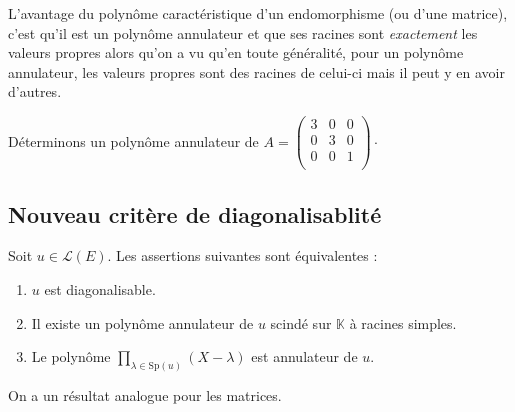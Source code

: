 \documentclass[french,11pt,twoside]{VcCours}
\begin{document}
 \begin{Remarque}{} L'avantage du polynôme caractéristique d'un endomorphisme (ou d'une matrice), c'est qu'il est un polynôme annulateur et que ses racines sont \emph{exactement} les valeurs propres alors qu'on a vu qu'en toute généralité, pour un polynôme annulateur, les valeurs propres sont des racines de celui-ci mais il peut y en avoir d'autres.
 \end{Remarque}
 
 \begin{Exemple}{} Déterminons un polynôme annulateur de $A = \begin{pmatrix}
 3 & 0 & 0 \\
 0 & 3 & 0\\
 0 & 0 & 1 \\
 \end{pmatrix}\cdot$
 
 \vspace{7cm}
% 
 \end{Exemple}
 
 \subsection{Nouveau critère de diagonalisablité}
 
 \begin{Theoreme}{} Soit $u \in \mathcal{L}(E)$. Les assertions suivantes sont équivalentes :
 
 \begin{enumerate}
 \item $u$ est diagonalisable.
 \item Il existe un polynôme annulateur de $u$ scindé sur $\mathbb{K}$ à racines simples.
 \item Le polynôme $\prod_{ \lambda \in \textrm{Sp}(u)} (X-\lambda)$ est annulateur de $u$.
 \end{enumerate}
 On a un résultat analogue pour les matrices.
 \end{Theoreme}
 
\end{document}
